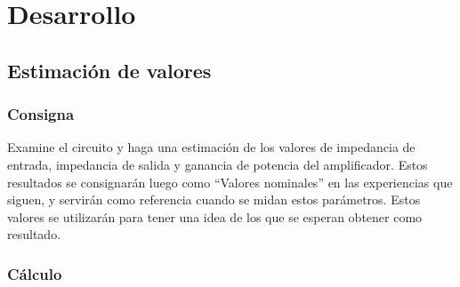 \chapter{Desarrollo}
\section{Estimación de valores}
\subsection{Consigna}
Examine el circuito y haga una estimación de los valores de impedancia de entrada, impedancia de salida y ganancia de potencia del amplificador. Estos resultados se consignarán luego como “Valores nominales” en las  experiencias que siguen, y servirán como referencia cuando se midan estos parámetros.
Estos valores se utilizarán para tener una idea de los que se esperan obtener como resultado.
\subsection{Cálculo}


